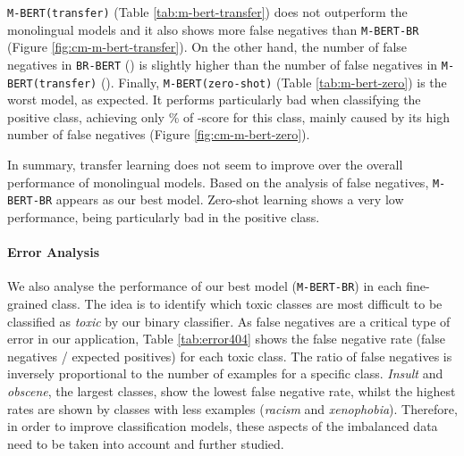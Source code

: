 \documentclass[11pt,a4paper]{article}
\begin{document}
\texttt{M-BERT(transfer)} (Table \ref{tab:m-bert-transfer}) does not outperform the monolingual models and it also shows more false negatives than \texttt{M-BERT-BR} (Figure \ref{fig:cm-m-bert-transfer}). On the other hand, the number of false negatives in \texttt{BR-BERT} () is slightly higher than the number of false negatives in \texttt{M-BERT(transfer)} (). Finally, \texttt{M-BERT(zero-shot)} (Table \ref{tab:m-bert-zero}) is the worst model, as expected. It performs particularly bad when classifying the positive class, achieving only \% of -score for this class, mainly caused by its high number of false negatives (Figure \ref{fig:cm-m-bert-zero}).






















In summary, transfer learning does not seem to improve over the overall performance of monolingual models. Based on the analysis of false negatives, \texttt{M-BERT-BR} appears as our best model. Zero-shot learning shows a very low performance, being particularly bad in the positive class.

\paragraph{Error Analysis}
We also analyse the performance of our best model (\texttt{M-BERT-BR}) in each fine-grained class. The idea is to identify which toxic classes are most difficult to be classified as \textit{toxic} by our binary classifier. As false negatives are a critical type of error in our application, Table \ref{tab:error404} shows the false negative rate (false negatives / expected positives) for each toxic class. The ratio of false negatives is inversely proportional to the number of examples for a specific class. \textit{Insult} and \textit{obscene}, the largest classes, show the lowest false negative rate, whilst the highest rates are shown by classes with less examples (\textit{racism} and \textit{xenophobia}). Therefore, in order to improve classification models, these aspects of the imbalanced data need to be taken into account and further studied.  
\end{document}
